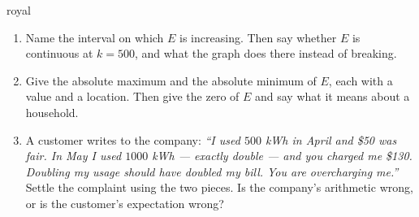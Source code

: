 \documentclass[10pt]{article}
\begin{document}
\begin{scenariobox}{royal}
\begin{enumerate}[leftmargin=1.6em, itemsep=6pt, topsep=2pt, start=6]

\item Name the interval on which $E$ is increasing. Then say whether $E$ is continuous at $k=500$,
and what the graph does there instead of breaking.


\item Give the absolute maximum and the absolute minimum of $E$, each with a value and a location.
Then give the zero of $E$ and say what it means about a household.


\item A customer writes to the company: \emph{``I used $500$ kWh in April and \$50 was fair. In May I
used $1000$ kWh --- exactly double --- and you charged me \$130. Doubling my usage should have
doubled my bill. You are overcharging me.''} Settle the complaint using the two pieces. Is the
company's arithmetic wrong, or is the customer's expectation wrong?


\end{enumerate}
\end{scenariobox}

\vspace{0.10in}
\end{document}
